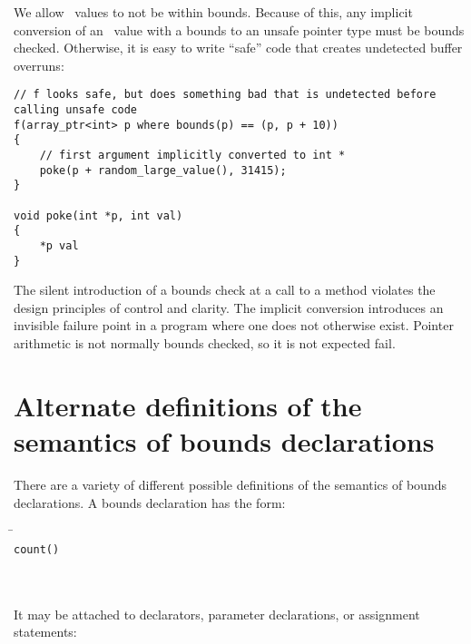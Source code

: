 We allow \arrayptr\ values to not be within bounds. Because of
this, any implicit conversion of an \arrayptr\ value with a
bounds to an unsafe pointer type must be bounds checked. Otherwise, it
is easy to write ``safe'' code that creates undetected buffer overruns:

\begin{verbatim}
// f looks safe, but does something bad that is undetected before calling unsafe code
f(array_ptr<int> p where bounds(p) == (p, p + 10))
{
    // first argument implicitly converted to int *
    poke(p + random_large_value(), 31415);  
}

void poke(int *p, int val)
{
    *p val
}
\end{verbatim}

The silent introduction of a bounds check at a call to a method violates
the design principles of control and clarity. The implicit conversion
introduces an invisible failure point in a program where one does not
otherwise exist. Pointer arithmetic is not normally bounds checked, so
it is not expected fail.

\section{Alternate definitions of the semantics of bounds declarations}

There are a variety of different possible definitions of the semantics
of bounds declarations. A bounds declaration has the form:

\begin{quote}
\end{quote}

\begin{tabbing}
\= \\
\> \texttt{count(}\texttt{)} \\
\>  \\
\> \boundsnone \\
\> \boundsany
\end{tabbing}

It may be attached to declarators, parameter declarations, or assignment statements:

